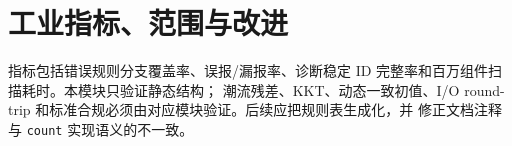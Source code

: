 \documentclass[UTF8,fontset=fandol,a4paper,11pt]{ctexart}
\begin{document}
\section{工业指标、范围与改进}
指标包括错误规则分支覆盖率、误报/漏报率、诊断稳定 ID 完整率和百万组件扫描耗时。本模块只验证静态结构；
潮流残差、KKT、动态一致初值、I/O round-trip 和标准合规必须由对应模块验证。后续应把规则表生成化，并
修正文档注释与 \texttt{count} 实现语义的不一致。



\end{document}
